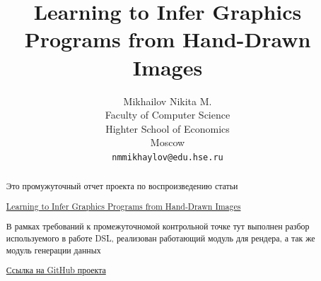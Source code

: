 \documentclass{article}
\title{Learning to Infer Graphics Programs from Hand-Drawn Images}
\author{%
  Mikhailov Nikita M.\\
  Faculty of Computer Science\\
  Highter School of Economics\\
  Moscow\\
  \texttt{nmmikhaylov@edu.hse.ru} \\
}
\begin{document}

\maketitle

\begin{abstract}
  Это промужуточный отчет проекта по воспроизведению статьи 
  \begin{center}
      \href{https://arxiv.org/pdf/1707.09627.pdf}{Learning to Infer Graphics Programs from Hand-Drawn Images}
  \end{center}
  В рамках требований к промежуточномой контрольной точке тут выполнен разбор используемого в работе DSL, реализован работающий модуль для рендера, а так же модуль генерации данных
  \begin{center}
      \href{https://github.com/Mikhail-off/Hand-Drawn-Images-Recognition}{Ссылка на GitHub проекта}
  \end{center}
\end{abstract}
\end{document}
